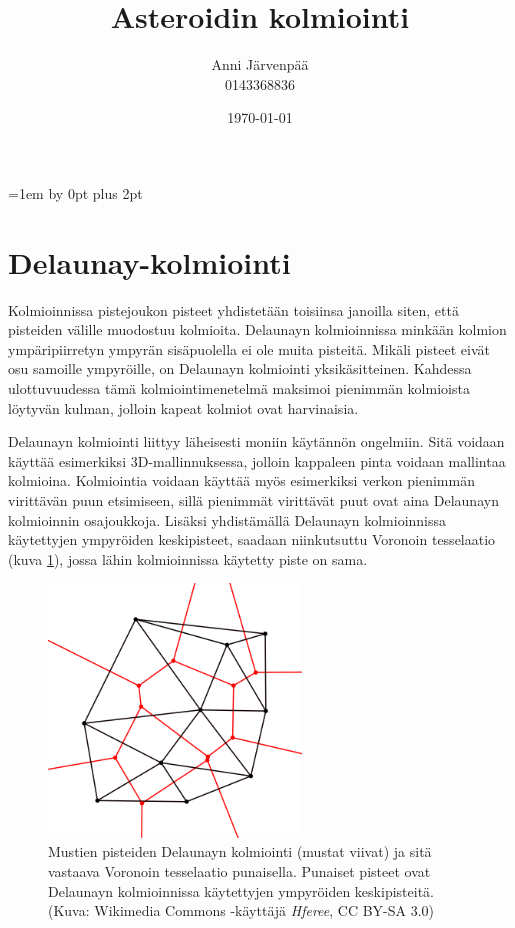 \documentclass[12pt,a4paper,titlepage]{article}
\title{Asteroidin kolmiointi\vspace{0.5em}}
\author{Anni Järvenpää\\0143368836}
\date{\today}
\begin{document}
\maketitle


\newpage
\thispagestyle{empty}
\tableofcontents
\newpage
\setcounter{page}{1}
\parskip=1em \advance\parskip by 0pt plus 2pt
\pagestyle{fancy}


\section{Delaunay-kolmiointi}
Kolmioinnissa pistejoukon pisteet yhdistetään toisiinsa janoilla siten, että pisteiden välille muodostuu kolmioita. Delaunayn kolmioinnissa minkään kolmion ympäripiirretyn ympyrän sisäpuolella ei ole muita pisteitä. Mikäli pisteet eivät osu samoille ympyröille, on Delaunayn kolmiointi yksikäsitteinen. Kahdessa ulottuvuudessa tämä kolmiointimenetelmä maksimoi pienimmän kolmioista löytyvän kulman, jolloin kapeat kolmiot ovat harvinaisia. \cite{maur2002delaunay}

Delaunayn kolmiointi liittyy läheisesti moniin käytännön ongelmiin. Sitä voidaan käyttää esimerkiksi 3D-mallinnuksessa, jolloin kappaleen pinta voidaan mallintaa kolmioina. Kolmiointia voidaan käyttää myös esimerkiksi verkon pienimmän virittävän puun etsimiseen, sillä pienimmät virittävät puut ovat aina Delaunayn kolmioinnin osajoukkoja. Lisäksi yhdistämällä Delaunayn kolmioinnissa käytettyjen ympyröiden keskipisteet, saadaan niinkutsuttu Voronoin tesselaatio (kuva \ref{voronoi}), jossa lähin kolmioinnissa käytetty piste on sama. \cite{maur2002delaunay, peterson}


\begin{figure}
  \centering
  \includegraphics[width=0.6\textwidth]{kuvat/voronoi.png}
  \caption{Mustien pisteiden Delaunayn kolmiointi (mustat viivat) ja sitä vastaava Voronoin tesselaatio punaisella. Punaiset pisteet ovat Delaunayn kolmioinnissa käytettyjen ympyröiden keskipisteitä. (Kuva: Wikimedia Commons -käyttäjä \textit{Hferee}, CC BY-SA 3.0)}
  \label{voronoi}
\end{figure}
\end{document}
